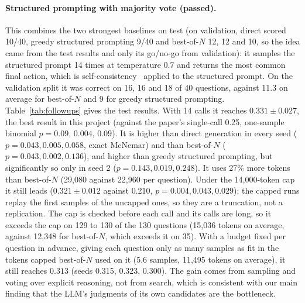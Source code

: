 \paragraph{Structured prompting with majority vote (passed).}
This combines the two strongest baselines on test (on validation, direct scored 10/40, greedy structured prompting 9/40 and best-of-$N$ 12, 12 and 10, so the idea came from the test results and only its go/no-go from validation): it samples the structured prompt 14 times at temperature
0.7 and returns the most common final action, which is self-consistency~\citep{wang2023selfconsistency} applied to the structured prompt. On the validation split it was correct on 16, 16 and 18 of 40 questions, against 11.3 on average for best-of-$N$ and 9 for greedy structured prompting.
Table~\ref{tab:followups} gives the test results. With 14 calls it reaches $0.331 \pm 0.027$, the best result in this project (against the paper's single-call 0.25, one-sample binomial $p = 0.09$, $0.004$, $0.09$). It is higher than direct generation in every seed ($p = 0.043, 0.005, 0.058$, exact McNemar) and than best-of-$N$ ($p = 0.043, 0.002, 0.136$), and higher than greedy structured prompting, but significantly so only in seed 2 ($p = 0.143, 0.019, 0.248$). It uses 27\% more tokens than best-of-$N$ (29,080 against 22,960 per question). Under the 14,000-token cap it still leads ($0.321 \pm 0.012$ against 0.210, $p = 0.004, 0.043, 0.029$); the capped runs replay the first samples of the uncapped ones, so they are a truncation, not a replication. The cap is checked before each call and its calls are long, so it exceeds the cap on 129 to 130 of the 130 questions (15,036 tokens on average, against 12,348 for best-of-$N$, which exceeds it on 35). With a budget fixed per question in advance, giving each question only as many samples as fit in the tokens capped best-of-$N$ used on it (5.6 samples, 11,495 tokens on average), it still reaches $0.313$ (seeds 0.315, 0.323, 0.300). The gain
comes from sampling and voting over explicit reasoning, not from search, which is consistent with
our main finding that the LLM's judgments of its own candidates are the bottleneck.



